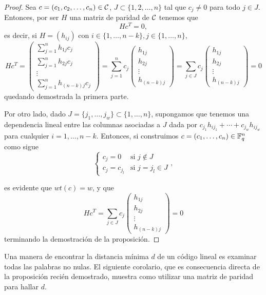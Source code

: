 \begin{proof}
    Sea \(c = (c_1, c_2, \dots, c_n) \in \mathcal{C}\), \(J \subset \{1, 2, \dots, n\}\) tal que \(c_j \neq 0\) para todo \(j \in J\). Entonces, por ser \(H\) una matriz de paridad de \(\mathcal{C}\) tenemos que
    \[
    Hc^T = 0,
    \]
es decir, si \(H = (h_{ij})\) con \(i \in \{1,\dots, n-k\}, j \in \{1,\dots, n\}\),
\[
Hc^T =
\begin{pmatrix}
   \sum_{j=1}^n h_{1j} c_j \\
   \sum_{j=1}^n h_{2j} c_j \\
    \vdots \\
   \sum_{j=1}^n h_{(n-k)j} c_j
\end{pmatrix}
= \sum_{j=1}^n c_j
\begin{pmatrix}
    h_{1j}\\
    h_{2j}\\
    \vdots \\
    h_{(n-k)j}
\end{pmatrix}
= \sum_{j\in J} c_j
\begin{pmatrix}
    h_{1j}\\
    h_{2j}\\
    \vdots \\
    h_{(n-k)j}
\end{pmatrix}
= 0
\]
quedando demostrada la primera parte.

Por otro lado, dado \(J = \{j_1, \dots, j_w\} \subset \{1, \dots, n\}\), supongamos que tenemos una dependencia lineal entre las columnas asociadas a \(J\) dada por \(c_{j_1}h_{i j_1} + \cdots + c_{j_w} h_{i j_w}\) para cualquier \(i = 1, \dots, n-k\). Entonces, si construimos \(c = (c_1, \dots, c_n) \in \mathbb{F}_q^n\) como sigue
\[
\begin{cases}
    c_j = 0 & \text{si } j \not \in J \\
    c_j = c_{j_l} & \text{si } j = j_l \in J
\end{cases}
,\]

es evidente que \(wt(c) = w\), y que
\[
Hc^T = \sum_{j \in J} c_j
\begin{pmatrix}
    h_{1j}\\
    h_{2j}\\
    \vdots \\
    h_{(n-k)j}
\end{pmatrix} = 0
\]
terminando la demostración de la proposición.
\end{proof}

Una manera de encontrar la distancia mínima \(d\) de un código lineal es examinar todas las palabras no nulas. El siguiente corolario, que es consecuencia directa de la proposición recién demostrado, muestra como utilizar una matriz de paridad para hallar \(d\).

